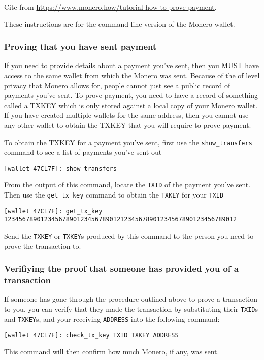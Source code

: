 	Cite from \url{https://www.monero.how/tutorial-how-to-prove-payment}.\par
	These instructions are for the command line version of the Monero wallet.
\subsubsection{Proving that you have sent payment}
	If you need to provide details about a payment you've sent, then you MUST have access to the same wallet from which the Monero was sent. Because of the of level privacy that Monero allows for, people cannot just see a public record of payments you've sent. To prove payment, you need to have a record of something called a TXKEY which is only stored against a local copy of your Monero wallet. If you have created multiple wallets for the same address, then you cannot use any other wallet to obtain the TXKEY that you will require to prove payment. \par
	To obtain the TXKEY for a payment you've sent, first use the \lstinline!show_transfers! command to see a list of payments you've sent out\par
\begin{lstlisting}
[wallet 47CL7F]: show_transfers
\end{lstlisting}
	From the output of this command, locate the \lstinline!TXID! of the payment you've sent. Then use the \lstinline!get_tx_key! command to obtain the \lstinline!TXKEY! for your \lstinline!TXID!
\begin{lstlisting}
[wallet 47CL7F]: get_tx_key 1234567890123456789012345678901212345678901234567890123456789012
\end{lstlisting}
	Send the \lstinline!TXKEY! or \lstinline!TXKEY!s produced by this command to the person you need to prove the transaction to.
\subsubsection{Verifiying the proof that someone has provided you of a transaction}
	If someone has gone through the procedure outlined above to prove a transaction to you, you can verify that they made the transaction by substituting their \lstinline!TXID!s and \lstinline!TXKEY!s, and your receiving \lstinline!ADDRESS! into the following command:
\begin{lstlisting}
[wallet 47CL7F]: check_tx_key TXID TXKEY ADDRESS
\end{lstlisting}
	This command will then confirm how much Monero, if any, was sent.
